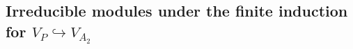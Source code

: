 \documentclass[12pt,a4paper,reqno]{amsart}
\numberwithin{equation}{section}
\numberwithin{equation}{section}
\newcommand\numberthis{\addtocounter{equation}{1}\tag{\theequation}}
\theoremstyle{definition}
\def\la{\lambda}
\def \al{\alpha}
\def\hr{\hookrightarrow}
\def \b {\beta}
\def \vac {\mathbf{1}}
\begin{document}
	\subsection{Irreducible modules under the finite induction for $V_P\hr V_{A_2}$} 
	
		
		
		
		
\end{document}
